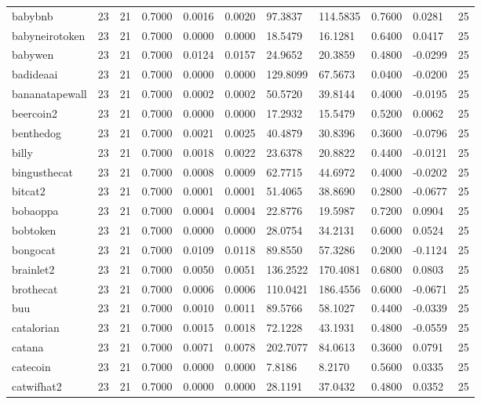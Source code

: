 \begin{table}[htbp]
\begin{tabular}{lllllllllll}
babybnb & 23 & 21 & 0.7000 & 0.0016 & 0.0020 & 97.3837 & 114.5835 & 0.7600 & 0.0281 & 25 \\
babyneirotoken & 23 & 21 & 0.7000 & 0.0000 & 0.0000 & 18.5479 & 16.1281 & 0.6400 & 0.0417 & 25 \\
babywen & 23 & 21 & 0.7000 & 0.0124 & 0.0157 & 24.9652 & 20.3859 & 0.4800 & -0.0299 & 25 \\
badideaai & 23 & 21 & 0.7000 & 0.0000 & 0.0000 & 129.8099 & 67.5673 & 0.0400 & -0.0200 & 25 \\
bananatapewall & 23 & 21 & 0.7000 & 0.0002 & 0.0002 & 50.5720 & 39.8144 & 0.4000 & -0.0195 & 25 \\
beercoin2 & 23 & 21 & 0.7000 & 0.0000 & 0.0000 & 17.2932 & 15.5479 & 0.5200 & 0.0062 & 25 \\
benthedog & 23 & 21 & 0.7000 & 0.0021 & 0.0025 & 40.4879 & 30.8396 & 0.3600 & -0.0796 & 25 \\
billy & 23 & 21 & 0.7000 & 0.0018 & 0.0022 & 23.6378 & 20.8822 & 0.4400 & -0.0121 & 25 \\
bingusthecat & 23 & 21 & 0.7000 & 0.0008 & 0.0009 & 62.7715 & 44.6972 & 0.4000 & -0.0202 & 25 \\
bitcat2 & 23 & 21 & 0.7000 & 0.0001 & 0.0001 & 51.4065 & 38.8690 & 0.2800 & -0.0677 & 25 \\
bobaoppa & 23 & 21 & 0.7000 & 0.0004 & 0.0004 & 22.8776 & 19.5987 & 0.7200 & 0.0904 & 25 \\
bobtoken & 23 & 21 & 0.7000 & 0.0000 & 0.0000 & 28.0754 & 34.2131 & 0.6000 & 0.0524 & 25 \\
bongocat & 23 & 21 & 0.7000 & 0.0109 & 0.0118 & 89.8550 & 57.3286 & 0.2000 & -0.1124 & 25 \\
brainlet2 & 23 & 21 & 0.7000 & 0.0050 & 0.0051 & 136.2522 & 170.4081 & 0.6800 & 0.0803 & 25 \\
brothecat & 23 & 21 & 0.7000 & 0.0006 & 0.0006 & 110.0421 & 186.4556 & 0.6000 & -0.0671 & 25 \\
buu & 23 & 21 & 0.7000 & 0.0010 & 0.0011 & 89.5766 & 58.1027 & 0.4400 & -0.0339 & 25 \\
catalorian & 23 & 21 & 0.7000 & 0.0015 & 0.0018 & 72.1228 & 43.1931 & 0.4800 & -0.0559 & 25 \\
catana & 23 & 21 & 0.7000 & 0.0071 & 0.0078 & 202.7077 & 84.0613 & 0.3600 & 0.0791 & 25 \\
catecoin & 23 & 21 & 0.7000 & 0.0000 & 0.0000 & 7.8186 & 8.2170 & 0.5600 & 0.0335 & 25 \\
catwifhat2 & 23 & 21 & 0.7000 & 0.0000 & 0.0000 & 28.1191 & 37.0432 & 0.4800 & 0.0352 & 25 \\

\end{tabular}
\end{table}
